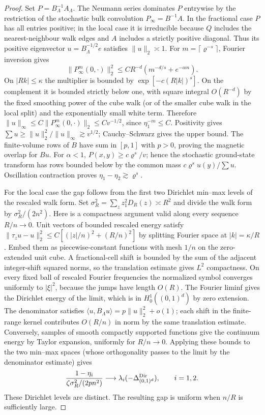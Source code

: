 \documentclass[11pt]{article}
\theoremstyle{definition}
\begin{document}
\begin{proof}
Set \(P=B_\Lambda^{-1}A_\Lambda\). The Neumann series dominates
\(P\) entrywise by the restriction of the stochastic bulk convolution
\(P_\infty=B^{-1}A\). In the fractional case \(P\) has all
entries positive; in the local case it is irreducible because
\(Q\) includes the nearest-neighbour walk edges and \(A\) includes
a strictly positive diagonal. Thus its positive eigenvector
\(u=B_\Lambda^{-1/2}e\) satisfies \(\|u\|_2\asymp1\).
For \(m=\lceil\varrho^{-s}\rceil\), Fourier inversion gives
\begin{equation}
 \|P_\infty^m(0,\cdot)\|_2^2\le C R^{-d}
                   (m^{-d/s}+e^{-a m}).
\end{equation}
On \(|Rk|\le\kappa\) the multiplier is bounded by
\(\exp[-c(R|k|)^s]\). On the complement it is bounded strictly
below one, with square integral \(O(R^{-d})\) by the fixed smoothing
power of the cube walk (or of the smaller cube walk in the local
split) and the exponentially small white term. Therefore
\(\|u\|_\infty\le C\|P_\infty^m(0,\cdot)\|_2\le C v^{-1/2}\),
since \(\eta_1^{-m}\le C\). Positivity gives
\(\sum u\ge \|u\|_2^2/\|u\|_\infty\gtrsim v^{1/2}\); Cauchy--Schwarz
gives the upper bound. The finite-volume rows of \(B\) have sum in
\([p,1]\) with \(p>0\), proving the magnetic overlap for \(Bu\).
For \(\alpha<1\), \(P(x,y)\ge c\varrho^s/v\); hence the stochastic
ground-state transform has rows bounded below by the common mass
\(c\varrho^s u(y)/\sum u\). Oscillation contraction proves
\(\eta_1-\eta_2\gtrsim\varrho^s\).

For the local case the gap follows from the first two Dirichlet
min--max levels of the rescaled walk form. Set
\(\sigma_R^2=\sum_z z_1^2 D_R(z)\asymp R^2\) and divide the walk
form by \(\sigma_R^2/(2n^2)\). Here is a compactness argument
valid along every sequence \(R/n\to0\). Unit vectors of bounded
rescaled energy satisfy
\(\|\tau_z u-u\|_2^2\le C[(|z|/n)^2+(R/n)^2]\) by splitting Fourier
space at \(|k|=\kappa/R\). Embed them as piecewise-constant functions
with mesh \(1/n\) on the zero-extended unit cube. A fractional-cell
shift is bounded by the sum of the adjacent integer-shift squared
norms, so the translation estimate gives \(L^2\) compactness.
On every fixed ball of rescaled Fourier frequencies the
normalized symbol converges uniformly to \(|\xi|^2\), because the
jumps have length \(O(R)\). The Fourier liminf gives the Dirichlet
energy of the limit, which is in \(H^1_0((0,1)^d)\) by zero extension.
The denominator satisfies
\(\langle u,B_\Lambda u\rangle=p\|u\|_2^2+o(1)\); each shift in the
finite-range kernel contributes \(O(R/n)\) in norm by the same
translation estimate. Conversely, samples of smooth compactly
supported functions give the continuum energy by Taylor expansion,
uniformly for \(R/n\to0\). Applying these bounds to the two min--max
spaces (whose orthogonality passes to the limit by the denominator
estimate) gives
\begin{equation}
 \frac{1-\eta_i}{\zeta\sigma_R^2/(2pn^2)}
     \longrightarrow \lambda_i(-\Delta_{(0,1)^d}^{\rm Dir}),
     \qquad i=1,2.
\end{equation}
These Dirichlet levels are distinct. The resulting gap is uniform
when \(n/R\) is sufficiently large.


\end{proof}
\end{document}
